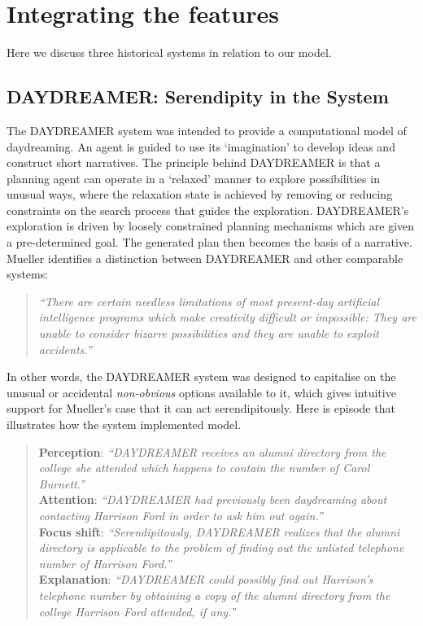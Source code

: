 \section{Integrating the features}\label{sec:system-analysis}

Here we discuss three historical systems in relation to our model. 

\subsection{{\sf DAYDREAMER}: Serendipity in the System}
The {\sf DAYDREAMER} system \cite{mueller1990} was intended to provide a computational model of daydreaming.  An agent is guided to use its `imagination' to develop ideas and construct short narratives.  The principle behind {\sf DAYDREAMER} is that a planning agent can operate in a `relaxed' manner to explore possibilities in unusual ways, where the relaxation state is achieved by removing or reducing constraints on the search process that guides the exploration.  {\sf DAYDREAMER}'s exploration is driven by loosely constrained planning mechanisms which are given a pre-determined goal.
The generated plan then becomes the basis of a narrative.
Mueller identifies a distinction between {\sf DAYDREAMER} and other comparable systems:
\begin{quote}
\emph{``There are certain needless limitations of most present-day
  artificial intelligence programs which make creativity difficult or
  impossible: They are unable to consider bizarre possibilities and
  they are unable to exploit accidents.''} \cite[p. 14]{mueller1990}
\end{quote}
In other words, the {\sf DAYDREAMER} system was designed to capitalise
on the unusual or accidental {\em non-obvious} options available to
it, which gives intuitive support for Mueller's case that it can act
serendipitously. 
Here is episode that illustrates how the system implemented model.
\begin{quote}
  \textbf{Perception}: \emph{``DAYDREAMER receives an alumni directory from the college she attended which happens to contain the number of Carol Burnett.''}\\
  \textbf{Attention}: \emph{``DAYDREAMER had previously been daydreaming about contacting Harrison Ford in order to ask him out again.''}\\
  \textbf{Focus shift}: \emph{``Serendipitously, DAYDREAMER realizes that the alumni directory is applicable to the problem of finding out the unlisted telephone number of Harrison Ford.''}\\
  \textbf{Explanation}: \emph{``DAYDREAMER could possibly find out Harrison's telephone number by obtaining a copy of the alumni directory from the college Harrison Ford attended, if any.''} \cite[p. 125]{mueller1990}
\end{quote}

